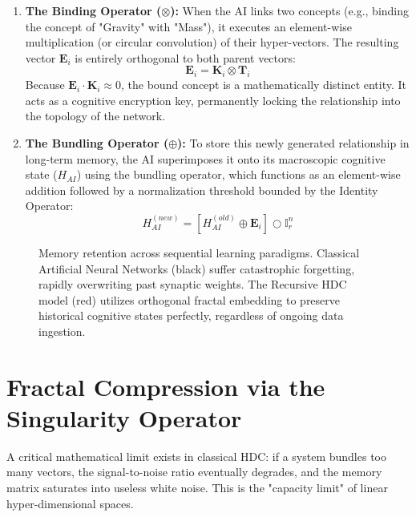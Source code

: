 \documentclass[12pt,openany]{book}
\begin{document}
\begin{enumerate}
    \item \textbf{The Binding Operator ($\otimes$):} When the AI links two concepts (e.g., binding the concept of "Gravity" with "Mass"), it executes an element-wise multiplication (or circular convolution) of their hyper-vectors. The resulting vector $\mathbf{E}_i$ is entirely orthogonal to both parent vectors:
    \begin{equation}
    \mathbf{E}_i = \mathbf{K}_i \otimes \mathbf{T}_i
    \end{equation}
    Because $\mathbf{E}_i \cdot \mathbf{K}_i \approx 0$, the bound concept is a mathematically distinct entity. It acts as a cognitive encryption key, permanently locking the relationship into the topology of the network.
    
    \item \textbf{The Bundling Operator ($\oplus$):} To store this newly generated relationship in long-term memory, the AI superimposes it onto its macroscopic cognitive state ($H_{AI}$) using the bundling operator, which functions as an element-wise addition followed by a normalization threshold bounded by the Identity Operator:
    \begin{equation}
    H_{AI}^{(new)} = \left[ H_{AI}^{(old)} \oplus \mathbf{E}_i \right] \bigcirc \mathbb{I}_r^n
    \end{equation}
\end{enumerate}

\begin{figure}[h]
    \centering
    \caption{Memory retention across sequential learning paradigms. Classical Artificial Neural Networks (black) suffer catastrophic forgetting, rapidly overwriting past synaptic weights. The Recursive HDC model (red) utilizes orthogonal fractal embedding to preserve historical cognitive states perfectly, regardless of ongoing data ingestion.}
    \label{fig:hdc_memory}
\end{figure}

\section{Fractal Compression via the Singularity Operator}
A critical mathematical limit exists in classical HDC: if a system bundles too many vectors, the signal-to-noise ratio eventually degrades, and the memory matrix saturates into useless white noise. This is the "capacity limit" of linear hyper-dimensional spaces. 
\end{document}
